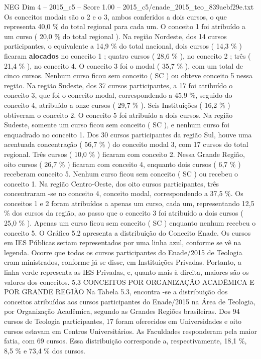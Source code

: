 \begin{textsample}{NEG Dim 4 – 2015\_c5 – Score 1.00 – 2015\_c5/enade\_2015\_teo\_839aebf29e.txt}
Os conceitos modais são o 2 e o 3, ambos conferidos a dois cursos, o que representa 40,0 \% do total regional para cada um.
O conceito 1 foi atribuído a um curso ( 20,0 \% do total regional ).
Na região Nordeste, dos 14 cursos participantes, o equivalente a 14,9 \% do total nacional, dois cursos ( 14,3 \% ) ficaram \textbf{alocados} no conceito 1 ; quatro cursos ( 28,6 \% ), no conceito 2 ; três ( 21,4 \% ), no conceito 4.
O conceito 3 foi o modal ( 35,7 \% ), com um total de cinco cursos.
Nenhum curso ficou sem conceito ( SC ) ou obteve conceito 5 nessa região.
Na região Sudeste, dos 37 cursos participantes, a 17 foi atribuído o conceito 3, que foi o conceito modal, correspondendo a 45,9 \%, seguido do conceito 4, atribuído a onze cursos ( 29,7 \% ).
Seis Instituições ( 16,2 \% ) obtiveram o conceito 2.
O conceito 5 foi atribuído a dois cursos.
Na região Sudeste, somente um curso ficou sem conceito ( SC ), e nenhum curso foi enquadrado no conceito 1.
Dos 30 cursos participantes da região Sul, houve uma acentuada concentração ( 56,7 \% ) do conceito modal 3, com 17 cursos do total regional.
Três cursos ( 10,0 \% ) ficaram com conceito 2.
Nessa Grande Região, oito cursos ( 26,7 \% ) ficaram com conceito 4, enquanto dois cursos ( 6,7 \% ) receberam conceito 5.
Nenhum curso ficou sem conceito ( SC ) ou recebeu o conceito 1.
Na região Centro-Oeste, dos oito cursos participantes, três concentraram -se no conceito 4, conceito modal, correspondendo a 37,5 \%.
Os conceitos 1 e 2 foram atribuídos a apenas um curso, cada um, representando 12,5 \% dos cursos da região, ao passo que o conceito 3 foi atribuído a dois cursos ( 25,0 \% ).
Apenas um curso ficou sem conceito ( SC ) enquanto nenhum recebeu o conceito 5.
O Gráfico 5.2 apresenta a distribuição do Conceito Enade.
Os cursos em IES Públicas seriam representados por uma linha azul, conforme se vê na legenda.
Ocorre que todos os cursos participantes do Enade/2015 de Teologia eram ministrados, conforme já se disse, em Instituições Privadas.
Portanto, a linha verde representa as IES Privadas, e, quanto mais à direita, maiores são os valores dos conceitos. 5.3 CONCEITOS POR ORGANIZAÇÃO ACADÊMICA E POR GRANDE REGIÃO Na Tabela 5.3, encontra -se a distribuição dos conceitos atribuídos aos cursos participantes do Enade/2015 na Área de Teologia, por Organização Acadêmica, segundo as Grandes Regiões brasileiras.
Dos 94 cursos de Teologia participantes, 17 foram oferecidos em Universidades e oito cursos estavam em Centros Universitários.
As Faculdades responderam pela maior fatia, com 69 cursos.
Essa distribuição corresponde a, respectivamente, 18,1 \%, 8,5 \% e 73,4 \% dos cursos.

\end{textsample}
